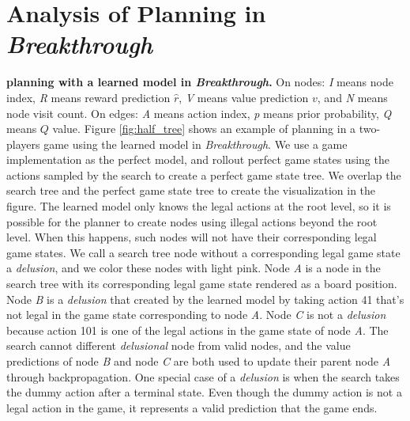 \section{Analysis of Planning in \textit{Breakthrough}}
{
    \textbf{\moozi planning with a learned model in \textit{Breakthrough}.}}
{
    On nodes: \textit{I} means node index, \textit{R} means reward prediction \(\hat{r}\), \textit{V} means value prediction $v$, and \textit{N} means node visit count.
    On edges: \textit{A} means action index, \textit{p} means prior probability, \textit{Q} means $Q$ value.
}
Figure \ref{fig:half_tree} shows an example of \moozi planning in a two-players game using the learned model in \textit{Breakthrough}.
We use a game implementation as the perfect model, and rollout perfect game states using the actions sampled by the search to create a perfect game state tree.
We overlap the \moozi search tree and the perfect game state tree to create the visualization in the figure.
The learned model only knows the legal actions at the root level, so it is possible for the planner to create nodes using illegal actions beyond the root level.
When this happens, such nodes will not have their corresponding legal game states.
We call a search tree node without a corresponding legal game state a \textit{delusion}, and we color these nodes with light pink.
Node \textit{A} is a node in the search tree with its corresponding legal game state rendered as a board position.
Node \textit{B} is a \textit{delusion} that created by the learned model by taking action 41 that's not legal in the game state corresponding to node \textit{A}.
Node \textit{C} is not a \textit{delusion} because action 101 is one of the legal actions in the game state of node \textit{A}.
The search cannot different \textit{delusional} node from valid nodes, and the value predictions of node \textit{B} and node \textit{C} are both used to update their parent node \textit{A} through backpropagation.
One special case of a \textit{delusion} is when the search takes the dummy action after a terminal state.
Even though the dummy action is not a legal action in the game, it represents a valid prediction that the game ends.



